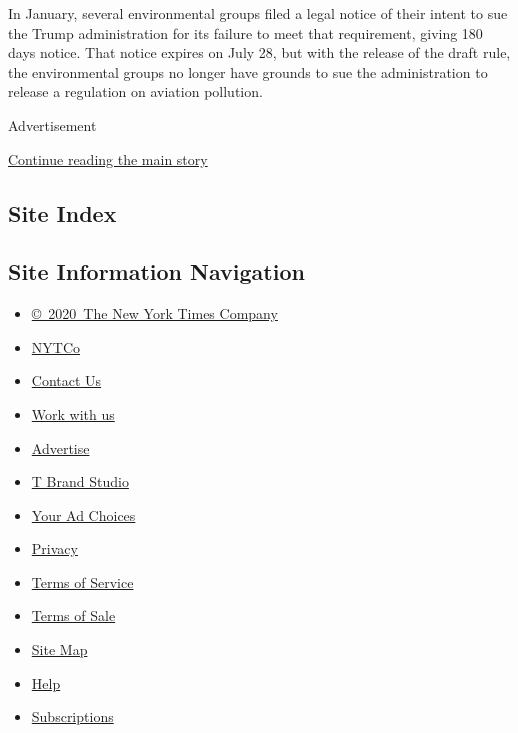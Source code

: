 In January, several environmental groups filed a legal notice of their
intent to sue the Trump administration for its failure to meet that
requirement, giving 180 days notice. That notice expires on July 28, but
with the release of the draft rule, the environmental groups no longer
have grounds to sue the administration to release a regulation on
aviation pollution.

Advertisement

\protect\hyperlink{after-bottom}{Continue reading the main story}

\hypertarget{site-index}{%
\subsection{Site Index}\label{site-index}}

\hypertarget{site-information-navigation}{%
\subsection{Site Information
Navigation}\label{site-information-navigation}}

\begin{itemize}
\tightlist
\item
  \href{https://help.nytimes3xbfgragh.onion/hc/en-us/articles/115014792127-Copyright-notice}{©~2020~The
  New York Times Company}
\end{itemize}

\begin{itemize}
\tightlist
\item
  \href{https://www.nytco.com/}{NYTCo}
\item
  \href{https://help.nytimes3xbfgragh.onion/hc/en-us/articles/115015385887-Contact-Us}{Contact
  Us}
\item
  \href{https://www.nytco.com/careers/}{Work with us}
\item
  \href{https://nytmediakit.com/}{Advertise}
\item
  \href{http://www.tbrandstudio.com/}{T Brand Studio}
\item
  \href{https://www.nytimes3xbfgragh.onion/privacy/cookie-policy\#how-do-i-manage-trackers}{Your
  Ad Choices}
\item
  \href{https://www.nytimes3xbfgragh.onion/privacy}{Privacy}
\item
  \href{https://help.nytimes3xbfgragh.onion/hc/en-us/articles/115014893428-Terms-of-service}{Terms
  of Service}
\item
  \href{https://help.nytimes3xbfgragh.onion/hc/en-us/articles/115014893968-Terms-of-sale}{Terms
  of Sale}
\item
  \href{https://spiderbites.nytimes3xbfgragh.onion}{Site Map}
\item
  \href{https://help.nytimes3xbfgragh.onion/hc/en-us}{Help}
\item
  \href{https://www.nytimes3xbfgragh.onion/subscription?campaignId=37WXW}{Subscriptions}
\end{itemize}
